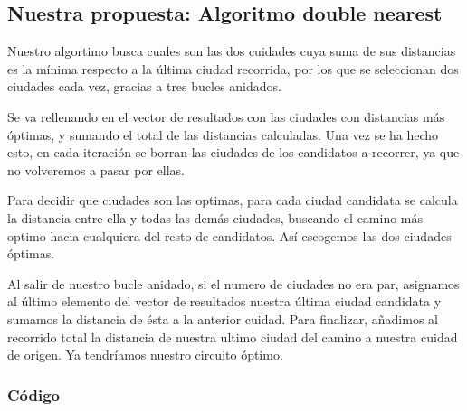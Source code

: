 \documentclass[a4]{article}
\begin{document}
\begin{figure}[H]
  \centering
{}
\end{figure}

\subsection{Nuestra propuesta: Algoritmo double nearest}

Nuestro algortimo busca cuales son las dos cuidades cuya suma de sus
distancias es la mínima respecto a la última ciudad recorrida, por los que se seleccionan dos ciudades cada vez, gracias a tres bucles
anidados.

Se va rellenando en el vector de resultados con las ciudades con
distancias más óptimas, y sumando el total de las distancias
calculadas. Una vez se ha hecho esto, en cada iteración se borran las
ciudades de los candidatos a recorrer, ya que no volveremos a pasar
por ellas.

Para decidir que ciudades son las optimas, para cada ciudad
candidata se calcula la distancia entre ella y todas las demás ciudades, buscando el camino más optimo hacia cualquiera del resto de candidatos. Así escogemos las dos ciudades óptimas.

Al salir de nuestro bucle anidado, si el numero de ciudades no era
par, asignamos al último elemento del vector de resultados nuestra
última ciudad candidata y sumamos la distancia de ésta a la anterior
cuidad.  Para finalizar, añadimos al recorrido total la distancia de
nuestra ultimo ciudad del camino a nuestra cuidad de origen. Ya
tendríamos nuestro circuito óptimo.

\subsubsection{Código}
\end{document}
